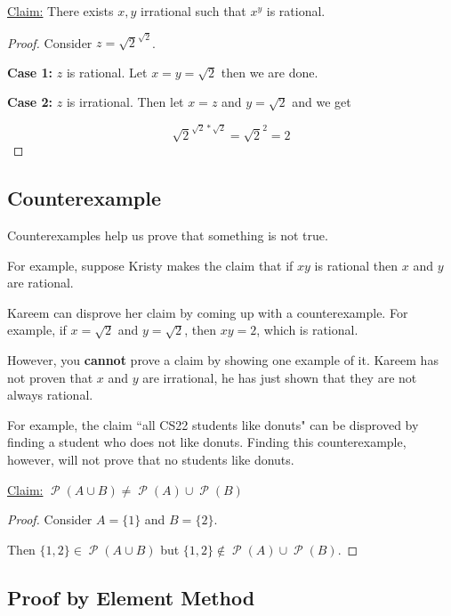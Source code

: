 \documentclass[12pt,letterpaper]{article}
\newcommand{\claim}{\underline{Claim:} }
\newcommand\Pow{\ensuremath{\operatorname{\mathcal{P}}}}
\begin{document}
    \begin{mdframed}
    \claim There exists $x,y$ irrational such that $x^y$ is rational.
    
   \begin{proof}
    
    Consider $z = \sqrt{2}^{\sqrt{2}}$.
    
    \textbf{Case 1:} $z$ is rational. Let $x = y = \sqrt{2}$ then we are done.
    
    \textbf{Case 2:} $z$ is irrational. Then let $x = z$ and $y = \sqrt{2}$ and we get
    
    \[\sqrt{2}^{\sqrt{2}*\sqrt{2}} = \sqrt{2}^2 = 2\]
    \end{proof}
    \end{mdframed}
    
    \subsection{Counterexample}
    
    Counterexamples help us prove that something is not true.

      For example, suppose Kristy makes the claim that if $xy$ is rational then $x$ and $y$ are rational.

      Kareem can disprove her claim by coming up with a counterexample. For example, if $x = \sqrt{2}$ and $y = \sqrt{2}$, then $xy = 2$, which is rational. 

      However, you \textbf{cannot} prove a claim by showing one example of it. Kareem has not proven that $x$ and $y$ are irrational, he has just shown that they are not always rational.

      For example, the claim ``all CS22 students like donuts" can be disproved by finding a student who does not like donuts. Finding this counterexample, however, will not prove that no students like donuts.
      
      
    \begin{mdframed}
    \claim $\Pow{(A\cup B)} \not= \Pow{(A)}\cup \Pow{(B)}$
    \begin{proof}

		Consider $A = \{1\}$ and $B = \{2\}$. 

		Then $\{1,2\} \in \Pow{(A\cup B)}$ but $\{1,2\} \not\in \Pow{(A)}\cup \Pow{(B)}$.
    \end{proof}    
    \end{mdframed}
    \subsection{Proof by Element Method}
    
\end{document}
